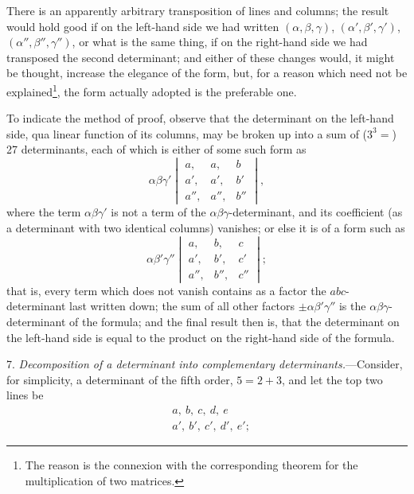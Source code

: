 \documentclass[12pt,a4paper,oneside]{book}
\begin{document}
There is an apparently arbitrary transposition of lines and columns; the result would hold good if on the left-hand side we had written $(\alpha,\beta,\gamma)$, $(\alpha',\beta',\gamma')$, $(\alpha'',\beta'',\gamma'')$, or what is the same thing, if on the right-hand side we had transposed the second determinant; and either of these changes would, it might be thought, increase the elegance of the form, but, for a reason which need not be explained\footnote{The reason is the connexion with the corresponding theorem for the multiplication of two matrices.}, the form actually adopted is the preferable one.

To indicate the method of proof, observe that the determinant on the left-hand side, qua linear function of its columns, may be broken up into a sum of ($3^{3}=$) 27 determinants, each of which is either of some such form as
\[
\alpha\beta\gamma'\begin{vmatrix} a, & a, & b \\ a', & a', & b' \\ a'', & a'', & b'' \end{vmatrix},
\]
where the term $\alpha\beta\gamma'$ is not a term of the $\alpha\beta\gamma$-determinant, and its coefficient (as a determinant with two identical columns) vanishes; or else it is of a form such as
\[
\alpha\beta'\gamma''\begin{vmatrix} a, & b, & c \\ a', & b', & c' \\ a'', & b'', & c'' \end{vmatrix};
\]
that is, every term which does not vanish contains as a factor the $abc$-determinant last written down; the sum of all other factors $\pm\alpha\beta'\gamma''$ is the $\alpha\beta\gamma$-determinant of the formula; and the final result then is, that the determinant on the left-hand side is equal to the product on the right-hand side of the formula.

7. \textit{Decomposition of a determinant into complementary determinants.}---Consider, for simplicity, a determinant of the fifth order, $5=2+3$, and let the top two lines be
\[
\begin{aligned}
&a,\ b,\ c,\ d,\ e\\
&a',\ b',\ c',\ d',\ e';
\end{aligned}
\]
\end{document}
